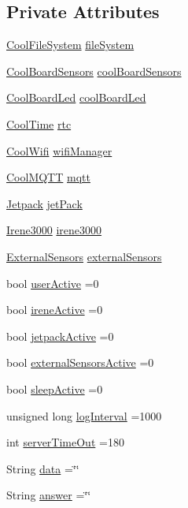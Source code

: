 \subsection*{Private Attributes}
\begin{DoxyCompactItemize}
\item 
\hyperlink{classCoolFileSystem}{Cool\+File\+System} \hyperlink{classCoolBoard_a42c2586fbb13ff7f06538e9284e8538d}{file\+System}
\item 
\hyperlink{classCoolBoardSensors}{Cool\+Board\+Sensors} \hyperlink{classCoolBoard_af102be5288bd7f7a8e59b13f86e26a00}{cool\+Board\+Sensors}
\item 
\hyperlink{classCoolBoardLed}{Cool\+Board\+Led} \hyperlink{classCoolBoard_a1b1d3c684a5baa56b08486e192fd8e97}{cool\+Board\+Led}
\item 
\hyperlink{classCoolTime}{Cool\+Time} \hyperlink{classCoolBoard_a50d2a6716879d64a85f3c6b44ad63275}{rtc}
\item 
\hyperlink{classCoolWifi}{Cool\+Wifi} \hyperlink{classCoolBoard_acd88e6003606b47479ebba81e4aceeca}{wifi\+Manager}
\item 
\hyperlink{classCoolMQTT}{Cool\+M\+Q\+TT} \hyperlink{classCoolBoard_a2399f44d7c23c1149a335cb3b46d90f1}{mqtt}
\item 
\hyperlink{classJetpack}{Jetpack} \hyperlink{classCoolBoard_a30b1357881b01ccbec676856a91e48e9}{jet\+Pack}
\item 
\hyperlink{classIrene3000}{Irene3000} \hyperlink{classCoolBoard_ad103718ce316006c4695b8eb312eaf11}{irene3000}
\item 
\hyperlink{classExternalSensors}{External\+Sensors} \hyperlink{classCoolBoard_a09e26264839c65873eb56af476eff6b2}{external\+Sensors}
\item 
bool \hyperlink{classCoolBoard_a6395459131d6889a3005f79c7a35e964}{user\+Active} =0
\item 
bool \hyperlink{classCoolBoard_a9c3f7ac625481ee2ae802a25d97a4ae0}{irene\+Active} =0
\item 
bool \hyperlink{classCoolBoard_a9be03a913d26e558328935ca3b59a75e}{jetpack\+Active} =0
\item 
bool \hyperlink{classCoolBoard_a638b00b76aeb819ecfd4c10b8cdd7bb7}{external\+Sensors\+Active} =0
\item 
bool \hyperlink{classCoolBoard_a0a51b2287139f66c738101fb53139230}{sleep\+Active} =0
\item 
unsigned long \hyperlink{classCoolBoard_a84bc94413b64973e4aba8c467c97006c}{log\+Interval} =1000
\item 
int \hyperlink{classCoolBoard_a7a8d8d3d316220cdd049cd63c1aa8fe6}{server\+Time\+Out} =180
\item 
String \hyperlink{classCoolBoard_a427fb753dd8575bdf821c70a5c63d695}{data} =\char`\"{}\char`\"{}
\item 
String \hyperlink{classCoolBoard_a7b835fafd449e5282f7f91d787a2dc15}{answer} =\char`\"{}\char`\"{}
\end{DoxyCompactItemize}


